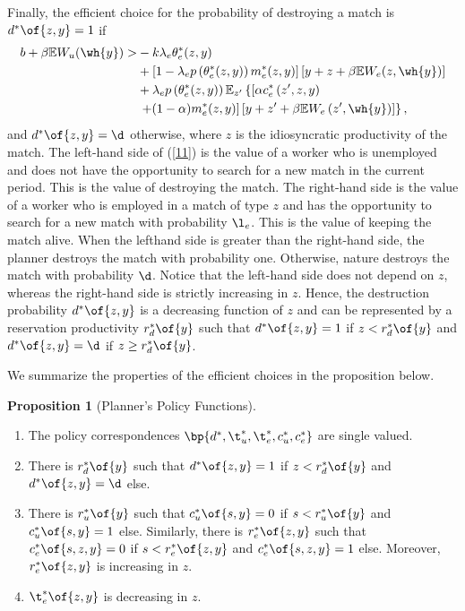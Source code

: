 \documentclass[12pt]{article}
\theoremstyle{definition}
\newtheorem{proposition}{Proposition}
\begin{document}
Finally, the efficient choice for the probability of destroying a match is $d^*\of{z, y} = 1$ if 
\begin{equation}
    \label{11}
    \begin{aligned}
        b+\beta \mathbb{E} W_u(\wh{y})> & -k \lambda_e \theta_e^*(z, y) \\
        & +\left[1-\lambda_e p\left(\theta_e^*(z, y)\right) m_e^*(z, y)\right]\left[y+z+\beta \mathbb{E} W_e(z, \wh{y})\right] \\
        & +\lambda_e p\left(\theta_e^*(z, y)\right) \mathbb{E}_{z^{\prime}}\left\{\left[\alpha c_e^*\left(z^{\prime}, z, y\right)\right.\right. \\
        & \left.\left.+(1-\alpha) m_e^*(z, y)\right]\left[y+z^{\prime}+\beta \mathbb{E} W_e\left(z^{\prime}, \wh{y}\right)\right]\right\},
    \end{aligned}
\end{equation}
and $d^*\of{z, y} = \d$ otherwise, where $z$ is the idiosyncratic productivity of the match. The left-hand side of (\ref{11}) is the value of a worker who is unemployed and does not have the opportunity to search for a new match in the current period. This is the value of destroying the match. The right-hand side is the value of a worker who is employed in a match of type $z$ and has the opportunity to search for a new match with probability $\l_e$. This is the value of keeping the match alive. When the lefthand side is greater than the right-hand side, the planner destroys the match with probability one. Otherwise, nature destroys the match with probability $\d$. Notice that the left-hand side does not depend on $z$, whereas the right-hand side is strictly increasing in $z$. Hence, the destruction probability $d^*\of{z, y}$ is a decreasing function of $z$ and can be represented by a reservation productivity $r_d^*\of{y}$ such that $d^*\of{z, y} = 1$ if $z < r_d^*\of{y}$ and $d^*\of{z,y} = \d$ if $z \geq r_d^*\of{y}$. 

We summarize the properties of the efficient choices in the proposition below.

\begin{proposition}[Planner's Policy Functions] \label{prop1}
    \begin{enumerate}[topsep=0pt, leftmargin=20pt, itemsep=0pt, label=(\roman*)]
        \setlength{\parskip}{10pt} 
        \item The policy correspondences $\bp{d^*, \t_u^*, \t_e^*, c_u^*, c_e^*}$ are single valued. 
        \item There is $r_d^*\of{y}$ such that $d^*\of{z, y} = 1$ if $z < r_d^*\of{y}$ and $d^*\of{z, y} = \d$ else. 
        \item There is $r_u^*\of{y}$ such that $c_u^*\of{s, y} = 0$ if $s < r_u^*\of{y}$ and $c_u^*\of{s, y} = 1$ else. Similarly, there is $r_e^*\of{z, y}$ such that $c_e^*\of{s, z, y} = 0$ if $s < r_e^*\of{z, y}$ and $c_e^*\of{s, z, y} = 1$ else. Moreover, $r_e^*\of{z, y}$ is increasing in $z$. 
        \item $\t_e^*\of{z,y}$ is decreasing in $z$. 
    \end{enumerate}
\end{proposition}
\end{document}
